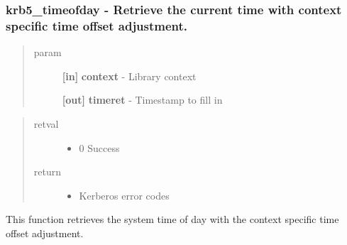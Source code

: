 \documentclass[letterpaper,10pt,english]{sphinxmanual}
\begin{document}
\subsubsection{krb5\_timeofday -  Retrieve the current time with context specific time offset adjustment.}
\label{appdev/refs/api/krb5_timeofday:krb5-timeofday-retrieve-the-current-time-with-context-specific-time-offset-adjustment}\label{appdev/refs/api/krb5_timeofday::doc}

\begin{fulllineitems}
\label{appdev/refs/api/krb5_timeofday:krb5_timeofday}
\end{fulllineitems}

\begin{quote}\begin{description}
\item[{param}] \leavevmode
\textbf{{[}in{]}} \textbf{context} - Library context

\textbf{{[}out{]}} \textbf{timeret} - Timestamp to fill in

\end{description}\end{quote}
\begin{quote}\begin{description}
\item[{retval}] \leavevmode\begin{itemize}
\item {} 
0   Success

\end{itemize}

\item[{return}] \leavevmode\begin{itemize}
\item {} 
Kerberos error codes

\end{itemize}

\end{description}\end{quote}

This function retrieves the system time of day with the context specific time offset adjustment.
\end{document}
